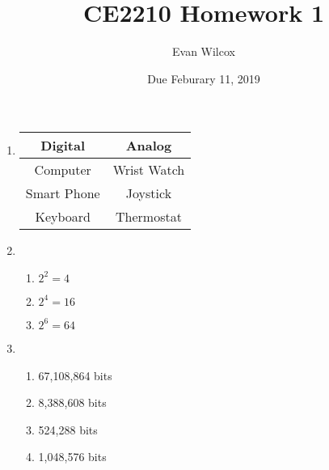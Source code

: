 \documentclass[a4paper]{article}
\title{CE2210 Homework 1}
\author{Evan Wilcox}
\date{Due Feburary 11, 2019}
\begin{document}
    \maketitle

    \begin{enumerate}
        
        \item
        \begin{tabular}{ |c|c| }
        \hline
        \textbf{Digital} & \textbf{Analog}\\
        \hline
        Computer & Wrist Watch\\
        \hline
        Smart Phone & Joystick\\
        \hline
        Keyboard & Thermostat\\
        \hline
        \end{tabular}


        \item
        \begin{enumerate}[label=\alph*)]
            
            \item $2^{2} = 4$

            \item $2^{4} = 16$

            \item $2^{6} = 64$
        
        \end{enumerate}



        \item
        \begin{enumerate}[label=\alph*)]
            
            \item 67,108,864 bits

            \item 8,388,608 bits

            \item 524,288 bits
        
            \item 1,048,576 bits

        \end{enumerate}


\end{enumerate}
\end{document}

